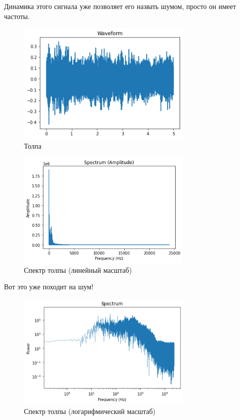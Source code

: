 \documentclass[a4paper,12pt]{report}
\begin{document}
    Динамика этого сигнала уже позволяет его назвать шумом, просто он имеет  частоты.
    
    \begin{figure}[H]
        \centering
        \includegraphics[width=0.75\textwidth]{ex1_crowd_wave.png}
        \caption{Толпа}
        \label{fig:ex1_crowd_wave}
    \end{figure}
    
    \begin{figure}[H]
        \centering
        \includegraphics[width=0.75\textwidth]{ex1_crowd_spectrum_amplitude.png}
        \caption{Спектр толпы (линейный масштаб)}
        \label{fig:ex1_crowd_spectrum_amplitude}
    \end{figure}
    
    Вот это уже походит на  шум!
    
    \begin{figure}[H]
        \centering
        \includegraphics[width=0.75\textwidth]{ex1_crowd_spectrum.png}
        \caption{Спектр толпы (логарифмический масштаб)}
        \label{fig:ex1_crowd_spectrum}
    \end{figure}
    
\end{document}

